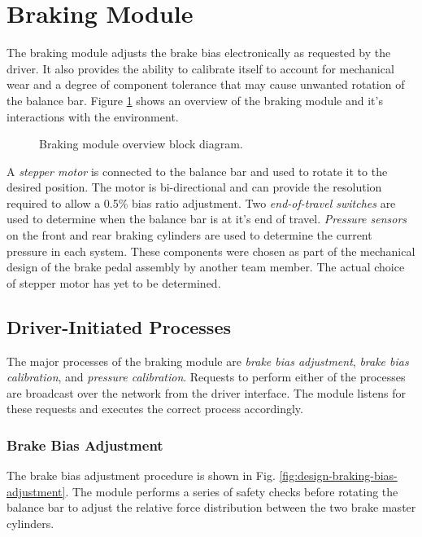 \section{Braking Module\label{sec:Braking-Module-Design}}

The braking module adjusts the brake bias electronically as requested by the driver. It also provides the ability to calibrate itself to account for mechanical wear and a degree of component tolerance that may cause unwanted rotation of the balance bar. Figure \ref{fig:design_brake_overview_block} shows an overview of the braking module and it's interactions with the environment. 

\begin{figure}[H]
\centering

\caption{Braking module overview block diagram.}
\label{fig:design_brake_overview_block}
\end{figure}

A \emph{stepper motor} is connected to the balance bar and used to rotate it to the desired position. The motor is bi-directional and can provide the resolution required to allow a 0.5\% bias ratio adjustment. Two \emph{end-of-travel switches} are used to determine when the balance bar is at it's end of travel. \emph{Pressure sensors} on the front and rear braking cylinders are used to determine the current pressure in each system. These components were chosen as part of the mechanical design of the brake pedal assembly by another team member. The actual choice of stepper motor has yet to be determined.

\subsection{Driver-Initiated Processes \label{sec:braking_processes}}

The major processes of the braking module are \emph{brake bias adjustment}, \emph{brake bias calibration}, and \emph{pressure calibration}. Requests to perform either of the processes are broadcast over the network from the driver interface. The module listens for these requests and executes the correct process accordingly. 

\subsubsection{Brake Bias Adjustment}

The brake bias adjustment procedure is shown in Fig. \ref{fig:design-braking-bias-adjustment}. The module performs a series of safety checks before rotating the balance bar to adjust the relative force distribution between the two brake master cylinders.

